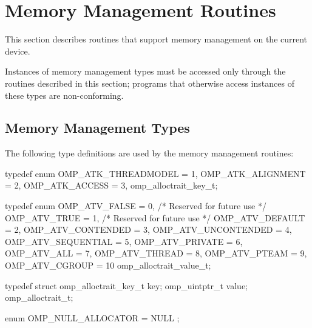 \section{Memory Management Routines}
\label{sec:Memory Management Routines}
This section describes routines that support memory management on the current device.

Instances of memory management types must be accessed only through the routines described in this section; programs that otherwise access instances of these types are non-conforming.

\subsection{Memory Management Types}
\label{subsec:Memory Management Types}

The following type definitions are used by the memory management routines:

\begin{ccppspecific}
\begin{ompEnv}
typedef enum {
  OMP_ATK_THREADMODEL = 1,
  OMP_ATK_ALIGNMENT = 2,
  OMP_ATK_ACCESS = 3,
} omp_alloctrait_key_t;

typedef enum {
  OMP_ATV_FALSE = 0,   /* Reserved for future use */
  OMP_ATV_TRUE = 1,    /* Reserved for future use */
  OMP_ATV_DEFAULT = 2,
  OMP_ATV_CONTENDED = 3,
  OMP_ATV_UNCONTENDED = 4,
  OMP_ATV_SEQUENTIAL = 5,
  OMP_ATV_PRIVATE = 6,
  OMP_ATV_ALL = 7,
  OMP_ATV_THREAD = 8,
  OMP_ATV_PTEAM = 9,
  OMP_ATV_CGROUP = 10
} omp_alloctrait_value_t;

typedef struct {
  omp_alloctrait_key_t key;
  omp_uintptr_t value;
} omp_alloctrait_t;

enum { OMP_NULL_ALLOCATOR = NULL };
\end{ompEnv}
\end{ccppspecific}

